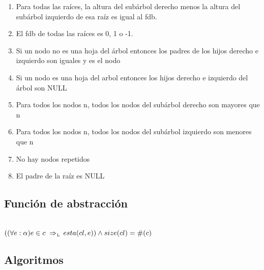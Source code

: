 \begin{enumerate}
	\item Para todas las raíces, la altura del subárbol derecho menos la altura del subárbol izquierdo de esa raíz es igual al fdb.
	\item El fdb de todas las raíces es 0, 1 o -1.
	\item Si un nodo no es una hoja del árbol entonces los padres de los hijos derecho e izquierdo son iguales y es el nodo
	\item Si un nodo es una hoja del arbol entonces los hijos derecho e izquierdo del árbol son NULL
	\item Para todos los nodos n, todos los nodos del subárbol derecho son mayores que n
	\item Para todos los nodos n, todos los nodos del subárbol izquierdo son menores que n
	\item No hay nodos repetidos
	\item El padre de la raíz es NULL
\end{enumerate}

\subsection{Función de abstracción}

 \\
$((\paratodo{\alpha}{e}) e \in c \impluego esta(cl,e)) \land size(cl) = \#(c)$

\newpage
\subsection{Algoritmos}

